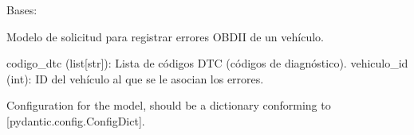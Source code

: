 \documentclass[letterpaper,10pt,spanish]{sphinxmanual}
\begin{document}

\begin{fulllineitems}
\label{\detokenize{endpoints:main.ErrorVehiculoRegistro}}
\pysigstartsignatures
\pysiglinewithargsret
{}
{\sphinxparamcomma {}\sphinxparamcomma {}}
{}
\pysigstopsignatures
\sphinxAtStartPar
Bases: 

\sphinxAtStartPar
Modelo de solicitud para registrar errores OBD\sphinxhyphen{}II de un vehículo.
\begin{description}
\sphinxAtStartPar
codigo\_dtc (list{[}str{]}): Lista de códigos DTC (códigos de diagnóstico).
vehiculo\_id (int): ID del vehículo al que se le asocian los errores.

\end{description}

\begin{fulllineitems}
\label{\detokenize{endpoints:main.ErrorVehiculoRegistro.codigo_dtc}}
\pysigstartsignatures
\pysigline
{}
\pysigstopsignatures
\end{fulllineitems}


\begin{fulllineitems}
\label{\detokenize{endpoints:main.ErrorVehiculoRegistro.model_config}}
\pysigstartsignatures
\pysigline
{}
\pysigstopsignatures
\sphinxAtStartPar
Configuration for the model, should be a dictionary conforming to {[}\sphinxtitleref{ConfigDict}{]}{[}pydantic.config.ConfigDict{]}.


\end{fulllineitems}
\end{fulllineitems}
\end{document}
